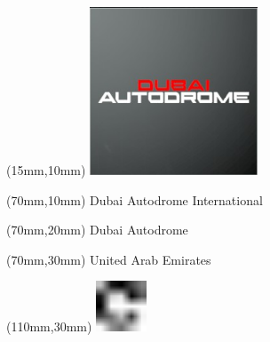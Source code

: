 \null\newpage
\begin{textblock*}{50mm}(15mm,10mm)%
\includegraphics[width=50mm]{LG/2015-05-20_00081.png}
\end{textblock*}
\begin{textblock*}{130mm}(70mm,10mm)%
{\fontsize{20}{20}\selectfont Dubai Autodrome International}\\
\end{textblock*}
\begin{textblock*}{120mm}(70mm,20mm)%
{\fontsize{16}{16}\selectfont Dubai Autodrome}\\
\end{textblock*}
\begin{textblock*}{120mm}(70mm,30mm)%
{\fontsize{12}{12}\selectfont United Arab Emirates}
\end{textblock*}
\begin{textblock*}{30mm}(110mm,30mm)%
\centering
\includegraphics[height=15mm]{icons/fa-rotate-right.pdf}
\end{textblock*}
